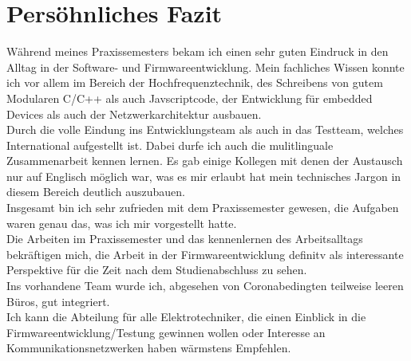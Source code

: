 \chapter{Persöhnliches Fazit}

Während meines Praxissemesters bekam ich einen sehr guten Eindruck in den Alltag in der 
Software- und Firmwareentwicklung. Mein fachliches Wissen konnte ich vor allem im Bereich der 
Hochfrequenztechnik, des Schreibens von gutem Modularen C/C++ als auch Javscriptcode, der Entwicklung für embedded Devices als auch 
der Netzwerkarchitektur ausbauen.\\
Durch die volle Eindung ins Entwicklungsteam als auch in das Testteam, welches International aufgestellt ist. Dabei durfe ich auch die mulitlinguale Zusammenarbeit kennen lernen. Es gab einige Kollegen mit denen der Austausch nur auf Englisch möglich war, was es mir erlaubt hat mein technisches Jargon in diesem Bereich deutlich auszubauen. \\
Insgesamt bin ich sehr zufrieden mit dem Praxissemester gewesen, die Aufgaben waren genau das, was ich mir vorgestellt hatte.  \\
Die Arbeiten im Praxissemester und das kennenlernen des Arbeitsalltags bekräftigen mich, die Arbeit in der Firmwareentwicklung definitv als interessante Perspektive für die Zeit nach dem Studienabschluss zu sehen.  \\
Ins vorhandene Team wurde ich, abgesehen von Coronabedingten teilweise leeren Büros, gut integriert. \\
Ich kann die Abteilung für alle Elektrotechniker, die einen Einblick in die Firmwareentwicklung/Testung gewinnen wollen oder Interesse an Kommunikationsnetzwerken haben wärmstens Empfehlen.